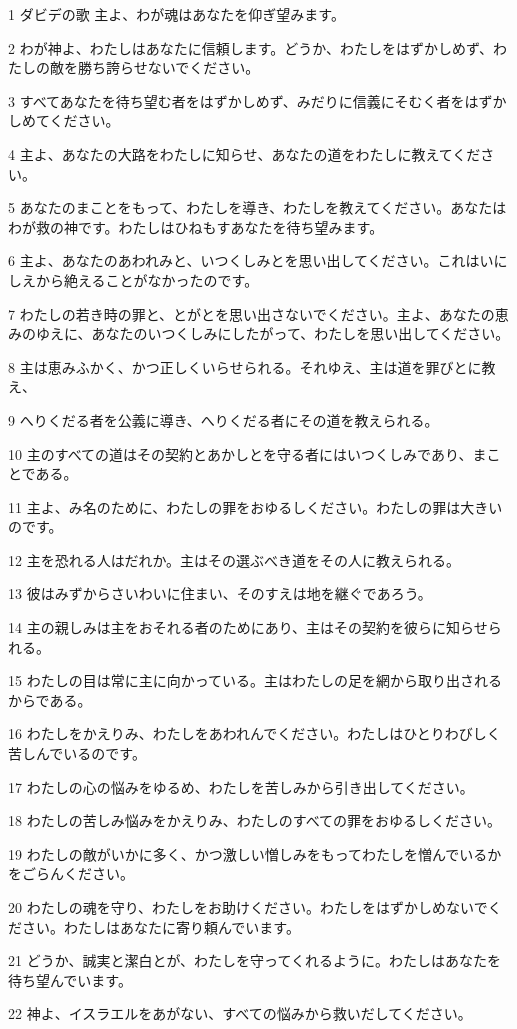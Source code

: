 \par 1 ダビデの歌 主よ、わが魂はあなたを仰ぎ望みます。
\par 2 わが神よ、わたしはあなたに信頼します。どうか、わたしをはずかしめず、わたしの敵を勝ち誇らせないでください。
\par 3 すべてあなたを待ち望む者をはずかしめず、みだりに信義にそむく者をはずかしめてください。
\par 4 主よ、あなたの大路をわたしに知らせ、あなたの道をわたしに教えてください。
\par 5 あなたのまことをもって、わたしを導き、わたしを教えてください。あなたはわが救の神です。わたしはひねもすあなたを待ち望みます。
\par 6 主よ、あなたのあわれみと、いつくしみとを思い出してください。これはいにしえから絶えることがなかったのです。
\par 7 わたしの若き時の罪と、とがとを思い出さないでください。主よ、あなたの恵みのゆえに、あなたのいつくしみにしたがって、わたしを思い出してください。
\par 8 主は恵みふかく、かつ正しくいらせられる。それゆえ、主は道を罪びとに教え、
\par 9 へりくだる者を公義に導き、へりくだる者にその道を教えられる。
\par 10 主のすべての道はその契約とあかしとを守る者にはいつくしみであり、まことである。
\par 11 主よ、み名のために、わたしの罪をおゆるしください。わたしの罪は大きいのです。
\par 12 主を恐れる人はだれか。主はその選ぶべき道をその人に教えられる。
\par 13 彼はみずからさいわいに住まい、そのすえは地を継ぐであろう。
\par 14 主の親しみは主をおそれる者のためにあり、主はその契約を彼らに知らせられる。
\par 15 わたしの目は常に主に向かっている。主はわたしの足を網から取り出されるからである。
\par 16 わたしをかえりみ、わたしをあわれんでください。わたしはひとりわびしく苦しんでいるのです。
\par 17 わたしの心の悩みをゆるめ、わたしを苦しみから引き出してください。
\par 18 わたしの苦しみ悩みをかえりみ、わたしのすべての罪をおゆるしください。
\par 19 わたしの敵がいかに多く、かつ激しい憎しみをもってわたしを憎んでいるかをごらんください。
\par 20 わたしの魂を守り、わたしをお助けください。わたしをはずかしめないでください。わたしはあなたに寄り頼んでいます。
\par 21 どうか、誠実と潔白とが、わたしを守ってくれるように。わたしはあなたを待ち望んでいます。
\par 22 神よ、イスラエルをあがない、すべての悩みから救いだしてください。

